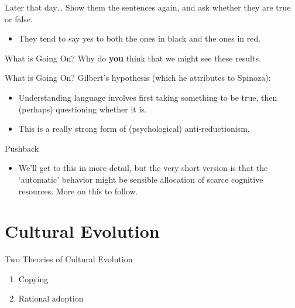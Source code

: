 \documentclass[
  17pt,
  letterpaper,
  ignorenonframetext,
  aspectratio=169,
  handout]{beamer}
\providecommand{\tightlist}{%
  \setlength{\itemsep}{0pt}\setlength{\parskip}{0pt}}\usepackage{longtable,booktabs,array}
\begin{document}
\begin{frame}{Later that day\ldots{}}
\protect\hypertarget{later-that-day}{}
Show them the sentences again, and ask whether they are true or false.

\begin{itemize}[<+->]
\tightlist
\item
  They tend to say yes to both the ones in black and the ones in red.
\end{itemize}
\end{frame}

\begin{frame}{What is Going On?}
\protect\hypertarget{what-is-going-on}{}
Why do \textbf{you} think that we might see these results.
\end{frame}

\begin{frame}{What is Going On?}
\protect\hypertarget{what-is-going-on-1}{}
Gilbert's hypothesis (which he attributes to Spinoza):

\begin{itemize}[<+->]
\tightlist
\item
  Understanding language involves first taking something to be true,
  then (perhaps) questioning whether it is.
\item
  This is a really strong form of (psychological) anti-reductionism.
\end{itemize}
\end{frame}

\begin{frame}{Pushback}
\protect\hypertarget{pushback}{}
\begin{itemize}[<+->]
\tightlist
\item
  We'll get to this in more detail, but the very short version is that
  the `automatic' behavior might be sensible allocation of scarce
  cognitive resources. More on this to follow.
\end{itemize}
\end{frame}

\hypertarget{cultural-evolution}{%
\section{Cultural Evolution}\label{cultural-evolution}}

\begin{frame}{Two Theories of Cultural Evolution}
\protect\hypertarget{two-theories-of-cultural-evolution}{}
\begin{enumerate}[<+->]
\tightlist
\item
  Copying
\item
  Rational adoption
\end{enumerate}
\end{frame}
\end{document}
